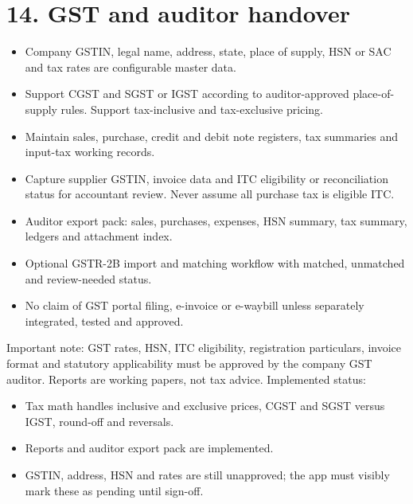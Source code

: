 \documentclass[11pt]{article}
\begin{document}
\section{14. GST and auditor handover}
\begin{itemize}[leftmargin=*,itemsep=2pt,topsep=2pt]
\item Company GSTIN, legal name, address, state, place of supply, HSN or SAC and tax rates are configurable master data.
\item Support CGST and SGST or IGST according to auditor-approved place-of-supply rules. Support tax-inclusive and tax-exclusive pricing.
\item Maintain sales, purchase, credit and debit note registers, tax summaries and input-tax working records.
\item Capture supplier GSTIN, invoice data and ITC eligibility or reconciliation status for accountant review. Never assume all purchase tax is eligible ITC.
\item Auditor export pack: sales, purchases, expenses, HSN summary, tax summary, ledgers and attachment index.
\item Optional GSTR-2B import and matching workflow with matched, unmatched and review-needed status.
\item No claim of GST portal filing, e-invoice or e-waybill unless separately integrated, tested and approved.
\end{itemize}
Important note: GST rates, HSN, ITC eligibility, registration particulars, invoice format and statutory applicability must be approved by the company GST auditor. Reports are working papers, not tax advice.
Implemented status:
\begin{itemize}[leftmargin=*,itemsep=2pt,topsep=2pt]
\item Tax math handles inclusive and exclusive prices, CGST and SGST versus IGST, round-off and reversals.
\item Reports and auditor export pack are implemented.
\item GSTIN, address, HSN and rates are still unapproved; the app must visibly mark these as pending until sign-off.
\end{itemize}
\clearpage
\end{document}

